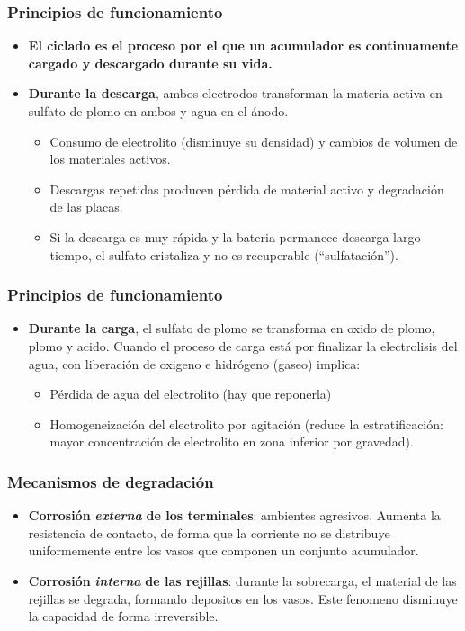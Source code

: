 \documentclass[serif, xcolor=dvipsnames]{beamer}
\begin{document}
\begin{frame}
\frametitle{Principios de funcionamiento}
\begin{itemize}
\item \textbf{El ciclado es el proceso por el que un acumulador es continuamente
cargado y descargado durante su vida.}
\item \textbf{Durante la descarga}, ambos electrodos transforman la materia
activa en sulfato de plomo en ambos y agua en el ánodo. 

\begin{itemize}
\item Consumo de electrolito (disminuye su densidad) y cambios de volumen
de los materiales activos.
\item Descargas repetidas producen pérdida de material activo y degradación
de las placas. 
\item Si la descarga es muy rápida y la bateria permanece descarga largo
tiempo, el sulfato cristaliza y no es recuperable ({}``sulfatación''). 
\end{itemize}
\end{itemize}

\end{frame}

\begin{frame}
\frametitle{Principios de funcionamiento}
\begin{itemize}
\item \textbf{Durante la carga}, el sulfato de plomo se transforma en oxido
de plomo, plomo y acido. Cuando el proceso de carga está por finalizar
la electrolisis del agua, con liberación de oxigeno e hidrógeno (gaseo)
implica:

\begin{itemize}
\item Pérdida de agua del electrolito (hay que reponerla) 
\item Homogeneización del electrolito por agitación (reduce la estratificación:
mayor concentración de electrolito en zona inferior por gravedad).
\end{itemize}
\end{itemize}

\end{frame}

\begin{frame}
\frametitle{Mecanismos de degradación}
\begin{itemize}
\item \textbf{Corrosión }\textbf{\emph{externa }}\textbf{de los terminales}:
ambientes agresivos. Aumenta la resistencia de contacto, de forma
que la corriente no se distribuye uniformemente entre los vasos que
componen un conjunto acumulador.
\item \textbf{Corrosión }\textbf{\emph{interna}}\textbf{ de las rejillas}:
durante la sobrecarga, el material de las rejillas se degrada, formando
depositos en los vasos. Este fenomeno disminuye la capacidad de forma
irreversible.
\end{itemize}

\end{frame}
\end{document}
